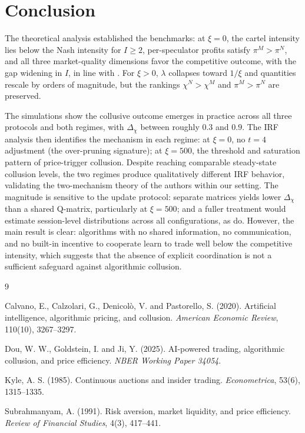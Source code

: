 \documentclass[11pt]{article}
\begin{document}
\section{Conclusion}
The theoretical analysis established the benchmarks: at $\xi=0$, the cartel 
intensity lies below the Nash intensity for $I\ge 2$, per-speculator profits 
satisfy $\pi^M>\pi^N$, and all three market-quality dimensions favor the 
competitive outcome, with the gap widening in $I$, in line with 
\citet{Subrahmanyam1991}. For $\xi>0$, $\lambda$ collapses toward $1/\xi$ and 
quantities rescale by orders of magnitude, but the rankings $\chi^N>\chi^M$ and 
$\pi^M>\pi^N$ are preserved.

The simulations show the collusive outcome emerges in practice across all three 
protocols and both regimes, with $\Delta_\chi$ between roughly $0.3$ and $0.9$. 
The IRF analysis then identifies the mechanism in each regime: at $\xi=0$, no 
$t=4$ adjustment (the over-pruning signature); at $\xi=500$, the threshold and saturation pattern of price-trigger collusion. Despite reaching comparable 
steady-state collusion levels, the two regimes produce qualitatively different 
IRF behavior, validating the two-mechanism theory of the authors within 
our setting. The magnitude is sensitive to the update protocol: separate matrices yields lower $\Delta_\chi$ than a shared Q-matrix, particularly at $\xi=500$; and a 
fuller treatment would estimate session-level distributions across all 
configurations, as \citet{Dou2025} do. However, the main result is clear: algorithms with no shared information, no communication, and no built-in 
incentive to cooperate learn to trade well below the competitive intensity, which suggests that the absence of explicit coordination is not a sufficient safeguard against algorithmic collusion.


\begin{thebibliography}{9}

Calvano, E., Calzolari, G., Denicolò, V. and Pastorello, S. (2020).
Artificial intelligence, algorithmic pricing, and collusion.
\textit{American Economic Review}, 110(10), 3267--3297.

Dou, W. W., Goldstein, I. and Ji, Y. (2025).
AI-powered trading, algorithmic collusion, and price efficiency.
\textit{NBER Working Paper 34054}.

Kyle, A. S. (1985).
Continuous auctions and insider trading.
\textit{Econometrica}, 53(6), 1315--1335.

Subrahmanyam, A. (1991).
Risk aversion, market liquidity, and price efficiency.
\textit{Review of Financial Studies}, 4(3), 417--441.

\end{thebibliography}

\newpage
\appendix


\end{document}
